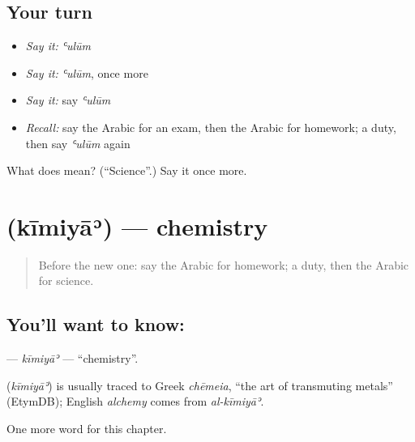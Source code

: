 \subsection*{Your turn}
\begin{itemize}
\raggedright
  \item \emph{Say it:} \emph{ʿulūm}
  \item \emph{Say it:} \emph{ʿulūm}, once more
  \item \emph{Say it:} say \emph{ʿulūm}
  \item \emph{Recall:} say the Arabic for an exam, then the Arabic for homework; a duty, then say \emph{ʿulūm} again
\end{itemize}

\begin{tcolorbox}[breakable,colback=teal!4,colframe=teal!35!black,title={Before you move on}]
What does  mean? (\textquotedblleft{}Science\textquotedblright{}.) Say it once more.
\end{tcolorbox}
\section[\texorpdfstring{\ar{كيمياء} (kīmiyāʾ)}{كيمياء (kīmiyāʾ)}]{ (kīmiyāʾ) — chemistry}

\label{lesson:AR-C222-kimiya}



\begin{quote}
Before the new one: say the Arabic for homework; a duty, then the Arabic for science.
\end{quote}

\subsection*{You'll want to know: }
\textbf{} — \emph{kīmiyāʾ} — \textquotedblleft{}chemistry\textquotedblright{}.

\begin{cousinweb}
\textbf{} (\emph{kīmiyāʾ}) is usually traced to Greek \emph{chēmeia}, \textquotedblleft{}the art of transmuting metals\textquotedblright{} (EtymDB); English \emph{alchemy} comes from \emph{al-kīmiyāʾ}.
\end{cousinweb}

\begin{grammarlens}[title={What you've built}]
One more word for this chapter.
\end{grammarlens}

